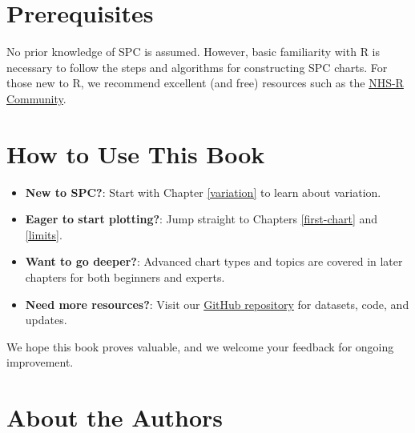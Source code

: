 \documentclass[
]{book}
\begin{document}
\section*{Prerequisites}\label{prerequisites}

No prior knowledge of SPC is assumed. However, basic familiarity with R is necessary to follow the steps and algorithms for constructing SPC charts. For those new to R, we recommend excellent (and free) resources such as the \href{https://nhsrcommunity.com/}{NHS-R Community}.

\section*{How to Use This Book}\label{how-to-use-this-book}

\begin{itemize}
\item
  \textbf{New to SPC?}: Start with Chapter \ref{variation} to learn about variation.
\item
  \textbf{Eager to start plotting?}: Jump straight to Chapters \ref{first-chart} and \ref{limits}.
\item
  \textbf{Want to go deeper?}: Advanced chart types and topics are covered in later chapters for both beginners and experts.
\item
  \textbf{Need more resources?}: Visit our \href{https://github.com/anhoej/spc4hc}{GitHub repository} for datasets, code, and updates.
\end{itemize}

We hope this book proves valuable, and we welcome your feedback for ongoing improvement.

\section*{About the Authors}\label{about-the-authors}
\end{document}
